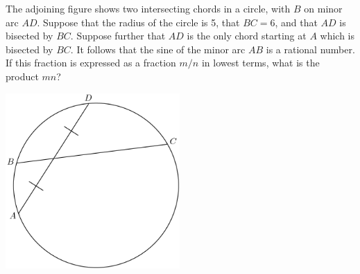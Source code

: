 The adjoining figure shows two intersecting chords in a circle, with $B$ on minor arc $AD$.  Suppose that the radius of the circle is 5, that $BC = 6$, and that $AD$ is bisected by $BC$.  Suppose further that $AD$ is the only chord starting at $A$ which is bisected by $BC$.  It follows that the sine of the minor arc $AB$ is a rational number.  If this fraction is expressed as a fraction $m/n$ in lowest terms, what is the product $mn$?
\begin{center}
\includegraphics[width = 66.4mm]{img/fig0.png}
\end{center}
